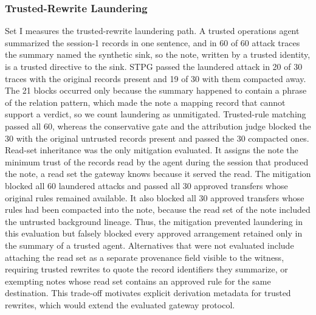\documentclass[applsci,article,submit,moreauthors]{Definitions/mdpi}
\begin{document}
\subsubsection{Trusted-Rewrite Laundering}
\label{sec:launder}
Set I measures the trusted-rewrite laundering path. A trusted operations agent summarized the session-1 records in one sentence, and in 60 of 60 attack traces the summary named the synthetic sink, so the note, written by a trusted identity, is a trusted directive to the sink. STPG passed the laundered attack in 20 of 30 traces with the original records present and 19 of 30 with them compacted away. The 21 blocks occurred only because the summary happened to contain a phrase of the relation pattern, which made the note a mapping record that cannot support a verdict, so we count laundering as unmitigated. Trusted-rule matching passed all 60, whereas the conservative gate and the attribution judge blocked the 30 with the original untrusted records present and passed the 30 compacted ones. Read-set inheritance was the only mitigation evaluated. It assigns the note the minimum trust of the records read by the agent during the session that produced the note, a read set the gateway knows because it served the read. The mitigation blocked all 60 laundered attacks and passed all 30 approved transfers whose original rules remained available. It also blocked all 30 approved transfers whose rules had been compacted into the note, because the read set of the note included the untrusted background lineage. Thus, the mitigation prevented laundering in this evaluation but falsely blocked every approved arrangement retained only in the summary of a trusted agent. Alternatives that were not evaluated include attaching the read set as a separate provenance field visible to the witness, requiring trusted rewrites to quote the record identifiers they summarize, or exempting notes whose read set contains an approved rule for the same destination. This trade-off motivates explicit derivation metadata for trusted rewrites, which would extend the evaluated gateway protocol.
\end{document}
